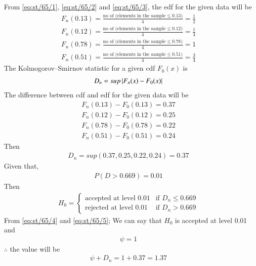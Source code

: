 \documentclass[article]{IEEEtran}
\theoremstyle{remark}
\begin{document}
From \eqref{eq:st/65/1}, \eqref{eq:st/65/2} and \eqref{eq:st/65/3}, the edf for the given data will be
\begin{align}
  	F_n(0.13) = \frac{\text{no of (elements in the sample} \le 0.13)}{4} = \frac{1}{2}	\\
  	F_n(0.12) = \frac{\text{no of (elements in the sample} \le 0.12)}{4} = \frac{1}{4}\\
  	F_n(0.78) = \frac{\text{no of (elements in the sample} \le 0.78)}{4} = 1\\
  	F_n(0.51) = \frac{\text{no of (elements in the sample} \le 0.51)}{4} = \frac{3}{4}
\end{align}
The Kolmogorov–Smirnov statistic for a given cdf $F_0(x)$ is
\begin{align}
  	D_n = sup\left\vert F_n(x) - F_0(x)\right\vert
\end{align}
The difference between cdf and edf for the given data will be
\begin{align}
  	F_n(0.13) - F_0(0.13) = 0.37\\
  	F_n(0.12) - F_0(0.12) = 0.25\\
  	F_n(0.78) - F_0(0.78) = 0.22\\
  	F_n(0.51) - F_0(0.51) = 0.24
\end{align}
Then 
\begin{align}
  	D_n = sup(0.37,0.25,0.22,0.24) = 0.37 \label{eq:st/65/4}
\end{align}
Given that,
\begin{align}
  	P (D > 0.669) = 0.01
\end{align}
Then
\begin{align}
H_0 =
\begin{cases}
\text{accepted at level } 0.01 & \text{if } D_n \le 0.669 \\
\text{rejected at level } 0.01 & \text{if } D_n > 0.669
\end{cases}\label{eq:st/65/5}
\end{align}
From \eqref{eq:st/65/4} and \eqref{eq:st/65/5}; We can say that $H_0$ is accepted at level 0.01 and 
\begin{align}
  	\psi = 1 
\end{align}
$\therefore$ the value will be 
\begin{align}
  	\psi + D_n = 1 + 0.37 = 1.37
\end{align}
\end{document}
